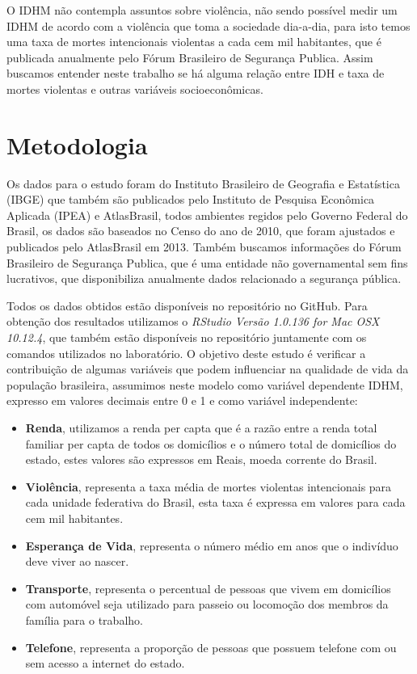 \documentclass[journal]{IEEEtran}
\begin{document}
O IDHM não contempla assuntos sobre violência, não sendo possível medir um IDHM de acordo com a violência que toma a sociedade dia-a-dia, para isto temos uma taxa de mortes intencionais violentas a cada cem mil habitantes, que é publicada anualmente pelo Fórum Brasileiro de Segurança Publica\cite{FBSP2017}. Assim buscamos entender neste trabalho se há alguma relação entre IDH e taxa de mortes violentas e outras variáveis socioeconômicas.  


\section{Metodologia}

Os dados para o estudo foram do Instituto Brasileiro de Geografia e Estatística (IBGE)\cite{IBGE2017} que também são publicados pelo Instituto de Pesquisa Econômica Aplicada (IPEA)\cite{Ipea2017} e AtlasBrasil\cite{Atlas2017}, todos ambientes regidos pelo Governo Federal do Brasil, os dados são baseados no Censo do ano de 2010, que foram ajustados e publicados pelo AtlasBrasil em 2013. Também buscamos informações do Fórum Brasileiro de Segurança Publica\cite{FBSP2017}, que é uma entidade não governamental sem fins lucrativos, que disponibiliza anualmente dados relacionado a segurança pública.

Todos os dados obtidos estão disponíveis no repositório\cite{RepoIgor2017} no GitHub. Para obtenção dos resultados utilizamos o \emph{RStudio Versão 1.0.136 for Mac OSX 10.12.4}, que também estão disponíveis no repositório\cite{RepoIgor2017} juntamente com os comandos utilizados no laboratório. O objetivo deste estudo é verificar a contribuição de algumas variáveis que podem influenciar na qualidade de vida da população brasileira, assumimos neste modelo como variável dependente IDHM, expresso em valores decimais entre 0 e 1 e como variável independente:

\begin{itemize}
\item {\textbf{Renda}, utilizamos a renda per capta que é a razão entre a renda total familiar per capta de todos os domicílios e o número total de domicílios do estado, estes valores são expressos em Reais, moeda corrente do Brasil.}
\item {\textbf{Violência}, representa a taxa média de mortes violentas intencionais para cada unidade federativa do Brasil, esta taxa é expressa em valores para cada cem mil habitantes.}
\item {\textbf{Esperança de Vida}, representa o número médio em anos que o indivíduo deve viver ao nascer.}
\item {\textbf{Transporte}, representa o percentual de pessoas que vivem em domicílios com automóvel seja utilizado para passeio ou locomoção dos membros da família para o trabalho.}
\item {\textbf{Telefone}, representa a proporção de pessoas que possuem telefone com ou sem acesso a internet do estado.}
\end{itemize}
\end{document}
